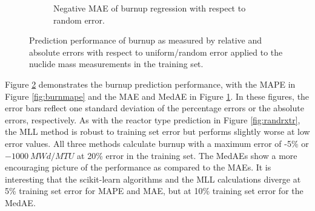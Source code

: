 \begin{figure}[!htb]
\begin{subfigure}[b]{0.5\textwidth}
    \caption{Negative \gls{MAE} of burnup regression with respect to 
             random error.}
    \label{fig:burnmae}
  \end{subfigure}
  \caption[Prediction performance of burnup regression with increasing training 
           set error]
          {Prediction performance of burnup as measured by relative and 
           absolute errors with respect to uniform/random error applied to the 
           nuclide mass measurements in the training set.}
  \label{fig:randburn}
\end{figure}

Figure \ref{fig:randburn} demonstrates the burnup prediction performance, with
the \gls{MAPE} in Figure \ref{fig:burnmape} and the \gls{MAE} and \gls{MedAE}
in Figure \ref{fig:burnmae}. In these figures, the error bars reflect one
standard deviation of the percentage errors or the absolute errors,
respectively.  As with the reactor type prediction in Figure
\ref{fig:randrxtr}, the \gls{MLL} method is robust to training set error but
performs slightly worse at low error values.  All three methods calculate
burnup with a maximum error of -5\% or $-1000\:MWd/MTU$ at 20\% error in the
training set. The \gls{MedAE}s show a more encouraging picture of the
performance as compared to the \gls{MAE}s. It is interesting that the
scikit-learn algorithms and the \gls{MLL} calculations diverge at 5\% training
set error for \gls{MAPE} and \gls{MAE}, but at 10\% training set error for the
\gls{MedAE}.

